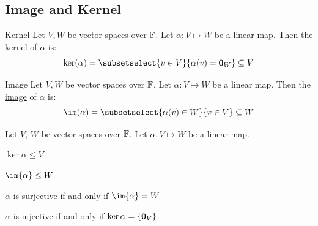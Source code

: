 \documentclass[../Main.tex]{subfiles}
\begin{document}
\subsection{Image and Kernel}
\begin{definition}{Kernel}
    Let $V, W$ be vector spaces over $\mathbb{F}$. Let $\alpha : V \mapsto W$ be a linear map. Then the \underline{kernel} of $\alpha$ is:
    \begin{equation*}
        \kera = \subsetselect{v \in V}{\alpha(v) = \zv_W} \subseteq V
    \end{equation*}
\end{definition}
\begin{definition}{Image}
    Let $V, W$ be vector spaces over $\mathbb{F}$. Let $\alpha : V \mapsto W$ be a linear map. Then the \underline{image} of $\alpha$ is:
    \begin{equation*}
        \im(\alpha) = \subsetselect{\alpha(v) \in W}{v \in V} \subseteq W
    \end{equation*}
\end{definition}
\begin{propositions}{
        Let $V$, $W$ be vector spaces over $\mathbb{F}$. Let $\alpha : V \mapsto W$ be a linear map.
        \label{propKernelImage}
    }
    \item $\ker{\alpha} \leq V$ \label{propKerSubspace}
    \item $\im{\alpha} \leq W$ \label{propKerImage}
    \item $\alpha$ is surjective if and only if $\im{\alpha} = W$ \label{propSurjectiveIffIm}
    \item $\alpha$ is injective if and only if $\ker{\alpha} = \{\boldsymbol{0}_V\}$ \label{propInjectiveIffKer}
\end{propositions}
\end{document}

